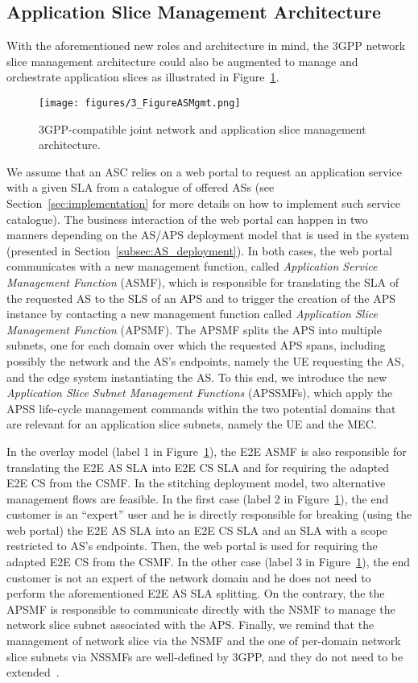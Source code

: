 \subsection{Application Slice Management Architecture}
\label{subsec:AS_Mgmt}
\noindent
%
With the aforementioned new roles and architecture in mind, the 3GPP network slice management architecture could also be augmented to manage and orchestrate application slices as illustrated in Figure~\ref{fig:aps_mngmt}.
%
\begin{figure}[ht]
\centering
\texttt{[image: figures/3\_FigureASMgmt.png]}
\caption{3GPP-compatible joint network and application slice management architecture.}
\label{fig:aps_mngmt}
\end{figure}
%
We assume that an ASC relies on a web portal to request an application service with a given SLA from a catalogue of offered ASs (see Section~\ref{sec:implementation} for more details on how to implement such service catalogue). The business interaction of the web portal can happen in two manners depending on the AS/APS deployment model that is used in the system (presented in Section~\ref{subsec:AS_deployment}). In both cases, the web portal communicates with a new management function, called \textit{Application Service Management Function} (ASMF), which is responsible for translating the SLA of the requested AS to the SLS of an APS and to trigger the creation of the APS instance by contacting a new management function called \textit{Application Slice Management Function} (APSMF). The APSMF splits the APS into multiple subnets, one for each domain over which the requested APS spans, including possibly the network and the AS's endpoints, namely the UE requesting the AS, and the edge system instantiating the AS. To this end, we introduce the new \textit{Application Slice Subnet Management Functions} (APSSMFs), which apply the APSS life-cycle management commands within the two potential domains that are relevant for an application slice subnets, namely the UE and the MEC.

In the overlay model (label 1 in Figure~\ref{fig:aps_mngmt}), the E2E ASMF is also responsible for translating the E2E AS SLA into E2E CS SLA and for requiring the adapted E2E CS from the CSMF. In the stitching deployment model, two alternative management flows are feasible. In the first case (label 2 in Figure~\ref{fig:aps_mngmt}), the end customer is an ``expert'' user and he is directly responsible for breaking (using the web portal) the E2E AS SLA into an E2E CS SLA and an SLA with a scope restricted to AS's endpoints. Then, the web portal is used for requiring the adapted E2E CS from the CSMF. In the other case (label 3 in Figure~\ref{fig:aps_mngmt}), the end customer is not an expert of the network domain and he does not need to perform the aforementioned E2E AS SLA splitting. On the contrary, the the APSMF is responsible to communicate directly with the NSMF to manage the network slice subnet associated with the APS. Finally, we remind that the management of network slice via the NSMF and the one of per-domain network slice subnets via NSSMFs are well-defined by 3GPP, and they do not need to be extended~\cite{3GPPTS28531,3GPPTS28541}. 

